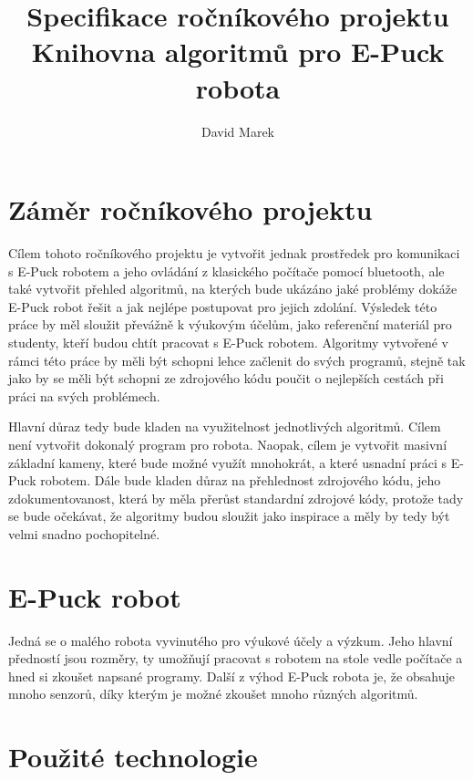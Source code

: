 \documentclass[11pt]{article}
\begin{document}
\author{David Marek}
\title{Specifikace ročníkového projektu\\Knihovna algoritmů pro E-Puck robota}
\date{}
\maketitle{}

\section{Záměr ročníkového projektu}

Cílem tohoto ročníkového projektu je vytvořit jednak prostředek pro komunikaci
s E-Puck robotem a jeho ovládání z klasického počítače pomocí bluetooth, ale
také vytvořit přehled algoritmů, na kterých bude ukázáno jaké problémy dokáže
E-Puck robot řešit a jak nejlépe postupovat pro jejich zdolání. Výsledek této
práce by měl sloužit převážně k výukovým účelům, jako referenční materiál pro
studenty, kteří budou chtít pracovat s E-Puck robotem. Algoritmy vytvořené v
rámci této práce by měli být schopni lehce začlenit do svých programů, stejně
tak jako by se měli být schopni ze zdrojového kódu poučit o nejlepších cestách
při práci na svých problémech.

Hlavní důraz tedy bude kladen na využitelnost jednotlivých algoritmů. Cílem
není vytvořit dokonalý program pro robota. Naopak, cílem je vytvořit masivní
základní kameny, které bude možné využít mnohokrát, a které usnadní práci s
E-Puck robotem. Dále bude kladen důraz na přehlednost zdrojového kódu, jeho
zdokumentovanost, která by měla přerůst standardní zdrojové kódy, protože tady
se bude očekávat, že algoritmy budou sloužit jako inspirace a měly by tedy být
velmi snadno pochopitelné.

\section{E-Puck robot}

Jedná se o malého robota vyvinutého pro výukové účely a výzkum. Jeho hlavní
předností jsou rozměry, ty umožňují pracovat s robotem na stole vedle počítače
a hned si zkoušet napsané programy. Další z výhod E-Puck robota je, že obsahuje
mnoho senzorů, díky kterým je možné zkoušet mnoho různých algoritmů.

\section{Použité technologie}
\end{document}
